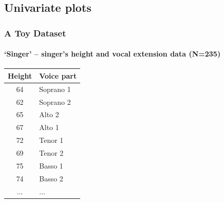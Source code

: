 \documentclass[aspectratio=1610]{beamer}
\begin{document}
\subsection{Univariate plots}


\begin{frame}
	\frametitle{A Toy Dataset}
	\framesubtitle{`Singer' -- singer's height and vocal extension data (N=235)}
	\begin{table}
		\begin{center}
			\begin{tabular}[c]{c|l}
				\multicolumn{1}{c|}{\textbf{Height}} &
				\multicolumn{1}{c}{\textbf{Voice part}}          \\
				\hline
				64                                   & Soprano 1 \\
				62                                   & Soprano 2 \\
				65                                   & Alto 2    \\
				67                                   & Alto 1    \\
				72                                   & Tenor 1   \\
				69                                   & Tenor 2   \\
				75                                   & Basso 1   \\
				74                                   & Basso 2   \\
				...                                  & ...       \\
			\end{tabular}
		\end{center}
	\end{table}

\end{frame}
\end{document}
